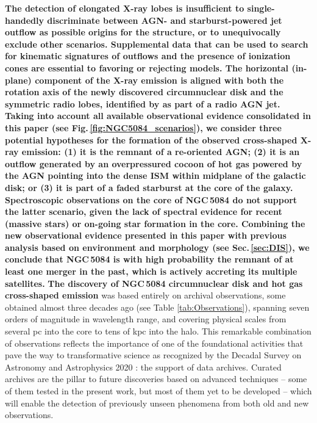 \documentclass[modern]{CORE-AAS/aastex631}
\begin{document}
\textbf{The detection of elongated X-ray lobes is insufficient to single-handedly discriminate between AGN- and starburst-powered jet outflow as possible origins for the structure, or to unequivocally exclude other scenarios. Supplemental data that can be used to search for kinematic signatures of outflows and the presence of ionization cones are essential to favoring or rejecting models.   
The horizontal (in-plane) component of the X-ray emission is aligned with both the rotation axis of the newly discovered circumnuclear disk and the symmetric radio lobes, identified by \citet{irwin+2019aj158_21} as part of a radio AGN jet. Taking into account all available observational evidence consolidated in this paper (see Fig.\,\ref{fig:NGC5084_scenarios}), we consider three potential hypotheses for the formation of the observed cross-shaped X-ray emission: (1) it is the remnant of a re-oriented AGN; (2) it is an outflow generated by an overpressured cocoon of hot gas powered by the AGN pointing into the dense ISM within midplane of the galactic disk; or (3) it is part of a faded starburst at the core of the galaxy. Spectroscopic observations on the core of NGC\,5084 do not support the latter scenario, given the lack of spectral evidence for recent (massive stars) or on-going star formation in the core.  Combining the new observational evidence presented in this paper with previous analysis based on environment and morphology (see Sec.\,\ref{sec:DIS}), we conclude that NGC\,5084 is with high probability the remnant of at least one merger in the past, which is actively accreting its multiple satellites.}
\textbf{The discovery of NGC\,5084 circumnuclear disk and hot gas cross-shaped emission} was based entirely on archival observations, some obtained almost three decades ago (see Table \ref{tab:Observations}), spanning seven orders of magnitude in wavelength range, and covering physical scales from several pc into the core to tens of kpc into the halo. This remarkable combination of observations reflects the importance of one of the foundational activities that pave the way to transformative science as recognized by the Decadal Survey on Astronomy and Astrophysics 2020 \citep{2021pdaa.book.....N}: the support of data archives. Curated archives are the pillar to future discoveries based on advanced techniques -- some of them tested in the present work, but most of them yet to be developed -- which will enable the detection of previously unseen phenomena from both old and new observations.
\end{document}
